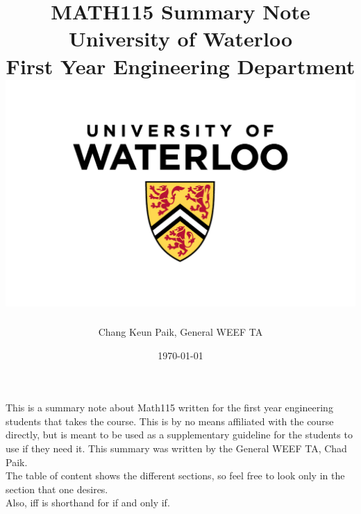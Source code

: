 \documentclass[12pt]{article}
\begin{document}

\begin{titlepage}
{\centering
\title{{MATH115 Summary Note}\\
{\huge University of Waterloo}\\
{\small  First Year Engineering Department}\\
{\includegraphics[scale=0.5]{UW.jpg}}}
\author{ \begin{tabular} {c} Chang Keun Paik, General WEEF TA \\
 \end{tabular}}
 \date {\today}
\maketitle
\par}
\thispagestyle{empty}
\end{titlepage}
\tableofcontents
\thispagestyle{empty}

\listoffigures
\thispagestyle{empty}
\clearpage

\setcounter{page}{1}


This is a summary note about Math115 written for the first year engineering students that takes the course. This is by no means affiliated with the course directly, but is meant to be used as a supplementary guideline for the students to use if they need it. This summary was written by the General WEEF TA, Chad Paik.\\
The table of content shows the different sections, so feel free to look only in the section that one desires.\\
Also, iff is shorthand for if and only if.
\end{document}
